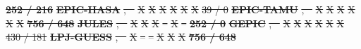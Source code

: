 \documentclass[gmd, manuscript]{copernicus} %
\providecommand{\DIFdel}[1]{{\protect\color{red}\sout{#1}}}                      %
\providecommand{\DIFdelFL}[1]{\DIFdel{#1}} %
\begin{document}
\textbf{\DIFdelFL{252 / 216}}%
\textbf{\DIFdelFL{EPIC-IIASA}}%
\DIFdelFL{,   \mbox{%
\citet{BALKOVIC2014}}\hspace{0pt}%
}%
\DIFdelFL{X}%
\DIFdelFL{X}%
\DIFdelFL{X}%
\DIFdelFL{X}%
\DIFdelFL{X}%
\DIFdelFL{X}%
\DIFdelFL{39 / 0}%
\textbf{\DIFdelFL{EPIC-TAMU}}%
\DIFdelFL{,    \mbox{%
\citet{Izaurralde06}}\hspace{0pt}%
}%
\DIFdelFL{X}%
\DIFdelFL{X}%
\DIFdelFL{X}%
\DIFdelFL{X}%
\DIFdelFL{X}%
\DIFdelFL{X}%
\textbf{\DIFdelFL{756 / 648}}%
\textbf{\DIFdelFL{JULES}}%
\DIFdelFL{,        \mbox{%
\citet{Osborne2015, Williams2015, Williams2017}}\hspace{0pt}%
}%
\DIFdelFL{X}%
\DIFdelFL{X}%
\DIFdelFL{X}%
\DIFdelFL{--}%
\DIFdelFL{X}%
\DIFdelFL{--}%
\textbf{\DIFdelFL{252 / 0}}%
\textbf{\DIFdelFL{GEPIC}}%
\DIFdelFL{,        \mbox{%
\citet{LIU2007478, FOLBERTH201221}}\hspace{0pt}%
}%
\DIFdelFL{X}%
\DIFdelFL{X}%
\DIFdelFL{X}%
\DIFdelFL{X}%
\DIFdelFL{X}%
\DIFdelFL{X}%
\DIFdelFL{430 / 181}%
\textbf{\DIFdelFL{LPJ-GUESS}}%
\DIFdelFL{,    \mbox{%
\citet{Lindeskog2013, Olin2015}}\hspace{0pt}%
}%
\DIFdelFL{X}%
\DIFdelFL{--}%
\DIFdelFL{--}%
\DIFdelFL{X}%
\DIFdelFL{X}%
\DIFdelFL{X}%
\textbf{\DIFdelFL{756 / 648}}%
\end{document}
